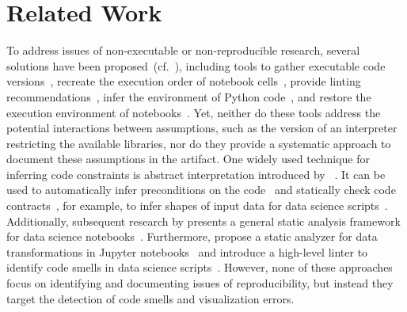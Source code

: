 \section{Related Work}\label{sec:related-work}
To address issues of non-executable or non-reproducible research, several solutions have been proposed~(cf.~\cite{siddik2025slr,donat2025r4r}), including tools to gather executable code versions~\cite{DBLP:conf/chi/HeadHBDD19}, recreate the execution order of notebook cells~\cite{DBLP:conf/kbse/WangKLZ20}, provide linting recommendations~\cite{DBLP:journals/ese/PimentelMBF21}, infer the environment of Python code~\cite{DBLP:conf/icse/HortonP19,DBLP:conf/icse/Ye0DW022}, and restore the execution environment of notebooks~\cite{DBLP:conf/icse/WangLZ21}. Yet, neither do these tools address the potential interactions between assumptions, such as the version of an interpreter restricting the available libraries, nor do they provide a systematic approach to document these assumptions in the artifact.
One widely used technique for inferring code constraints is abstract interpretation introduced by \citeauthor{DBLP:conf/popl/CousotC77}~\cite{DBLP:conf/popl/CousotC77}.
It can be used to automatically infer preconditions on the code~\cite{DBLP:conf/vmcai/CousotCFL13} and statically check code contracts~\cite{DBLP:journals/computer/Meyer92,DBLP:conf/foveoos/FahndrichL10}, for example, to infer shapes of input data for data science scripts~\cite{DBLP:journals/corr/abs-2007-10688,urban:hal-04249957}. Additionally, subsequent research by \citeauthor{DBLP:conf/icse/SuboticMS22} presents a general static analysis framework for data science notebooks~\cite{DBLP:conf/icse/SuboticMS22}. Furthermore, \citeauthor{DBLP:conf/pldi/NegriniSU23} propose a static analyzer for data transformations in Jupyter notebooks~\cite{DBLP:conf/pldi/NegriniSU23} and \citeauthor{10.1145/3689609.3689996} introduce a high-level linter to identify code smells in data science scripts~\cite{10.1145/3689609.3689996}. However, none of these approaches focus on identifying and documenting issues of reproducibility, but instead they target the detection of code smells and visualization errors.
